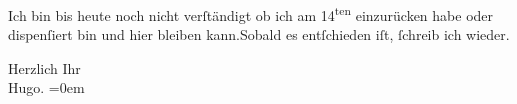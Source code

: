 \pstart
           Ich bin bis heute noch nicht verſtändigt ob ich am {\pb}14\textsuperscript{ten}
               einzurücken habe oder dispenſiert bin und hier bleiben kann.\hspace*{1.5em}Sobald es entſchieden iſt,{ }ſchreib ich wieder.\pend
           
\pstart
           Herzlich Ihr{\\[\baselineskip]}\spacefill\mbox{Hugo.}\pend
           \leftskip=0em{}\endnumbering{}  \newcommand{\dateiname}{L01423}\newcommand{\titel}{Hugo von Hofmannsthal an Arthur Schnitzler, 8. 8. 1904}\newcommand{\editorInnen}{Herausgegeben von Martin Anton Müller}
